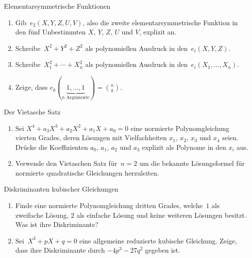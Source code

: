 \documentclass{algblatt}
\begin{document}
\vspace*{-1.5cm}

\begin{aufgabe}{Elementarsymmetrische Funktionen}
\begin{enumerate}
\item Gib~$e_2(X,Y,Z,U,V)$, also
die zweite elementarsymmetrische Funktion in den fünf Unbestimmten
$X$, $Y$, $Z$, $U$ und $V$, explizit an.
\item Schreibe~$X^2 + Y^2 + Z^2$ als polynomiellen Ausdruck in den~$e_i(X,Y,Z)$.
\item Schreibe~$X_1^2 + \cdots + X_n^2$ als polynomiellen Ausdruck in
den~$e_i(X_1,\ldots,X_n)$.
\item Zeige, dass $e_k(\underbrace{1, \dots, 1}_{\text{$n$ Argumente}}) = \binom{n}{k}$.
\end{enumerate}
\end{aufgabe}

\begin{aufgabe}{Der Vietasche Satz}
\begin{enumerate}
\item Sei $X^4 + a_3 X^3 + a_2 X^2 + a_1 X + a_0 = 0$ eine normierte Polynomgleichung
vierten Grades, deren Lösungen mit Vielfachheiten $x_1$, $x_2$, $x_3$
und $x_4$ seien. Drücke die Koeffizienten $a_0$, $a_1$, $a_2$ und
$a_3$ explizit als Polynome in den $x_i$ aus.
\item Verwende den Vietaschen Satz für~$n = 2$ um die bekannte Lösungsformel
für normierte quadratische Gleichungen herzuleiten.
\end{enumerate}
\end{aufgabe}

\begin{aufgabe}{Diskriminanten kubischer Gleichungen}
\begin{enumerate}
\item Finde eine normierte Polynomgleichung dritten Grades, welche~$1$
als zweifache Lösung, $2$ als einfache Lösung und keine weiteren Lösungen
besitzt. Was ist ihre Diskriminante?
\item Sei~$X^3 + p X + q = 0$ eine allgemeine reduzierte kubische Gleichung.
Zeige, dass ihre Diskriminante durch $-4 p^3 - 27 q^2$ gegeben ist.
\end{enumerate}
\end{aufgabe}
\end{document}
